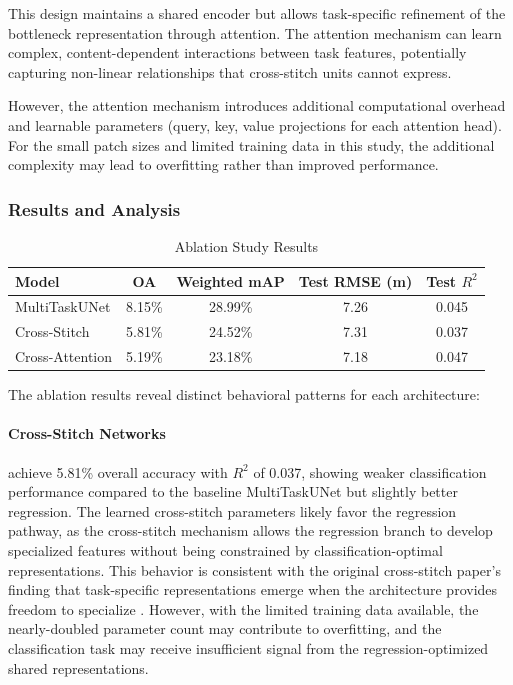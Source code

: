 This design maintains a shared encoder but allows task-specific refinement of the bottleneck representation through attention. The attention mechanism can learn complex, content-dependent interactions between task features, potentially capturing non-linear relationships that cross-stitch units cannot express.

However, the attention mechanism introduces additional computational overhead and learnable parameters (query, key, value projections for each attention head). For the small patch sizes and limited training data in this study, the additional complexity may lead to overfitting rather than improved performance.

\subsubsection{Results and Analysis}

\begin{table}[htbp]
\centering
\caption{Ablation Study Results}
\label{tab:ablation_results}
\begin{tabular}{lcccc}
\hline
\textbf{Model} & \textbf{OA} & \textbf{Weighted mAP} & \textbf{Test RMSE (m)} & \textbf{Test $R^2$} \\
\hline
MultiTaskUNet & 8.15\% & 28.99\% & 7.26 & 0.045 \\
Cross-Stitch & 5.81\% & 24.52\% & 7.31 & 0.037 \\
Cross-Attention & 5.19\% & 23.18\% & 7.18 & 0.047 \\
\hline
\end{tabular}
\end{table}

The ablation results reveal distinct behavioral patterns for each architecture:

\paragraph{Cross-Stitch Networks} achieve 5.81\% overall accuracy with $R^2$ of 0.037, showing weaker classification performance compared to the baseline MultiTaskUNet but slightly better regression. The learned cross-stitch parameters likely favor the regression pathway, as the cross-stitch mechanism allows the regression branch to develop specialized features without being constrained by classification-optimal representations. This behavior is consistent with the original cross-stitch paper's finding that task-specific representations emerge when the architecture provides freedom to specialize \cite{misra_cross-stitch_2016}. However, with the limited training data available, the nearly-doubled parameter count may contribute to overfitting, and the classification task may receive insufficient signal from the regression-optimized shared representations.

